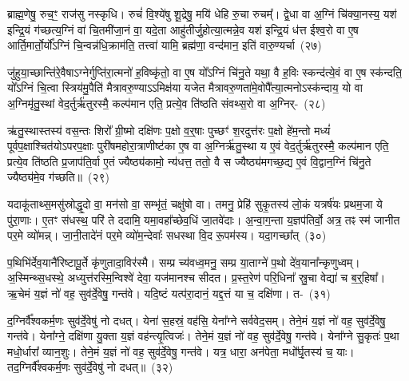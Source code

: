 ब्राह्म॒णेषु॒ रुच॒ꣳ॒ राज॑सु नस्कृधि। रुचं॑ वि॒श्ये॑षु शू॒द्रेषु॒ मयि॑ धेहि रु॒चा रुचम्᳚। द्वे॒धा वा अ॒ग्निं चि॑क्या॒नस्य॒ यश॑ इन्द्रि॒यं ग॑च्छत्य॒ग्निं वा॑ चि॒तमी॑जा॒नं वा॒ यदे॒ता आहु॑तीर्जु॒होत्या॒त्मन्ने॒व यश॑ इन्द्रि॒यं ध॑त्त ईश्व॒रो वा ए॒ष आर्ति॒मार्तो॒र्यो᳚\-ऽग्निं चि॒न्वन्न॑धि॒क्राम॑ति॒ तत्त्वा॑ यामि॒ ब्रह्म॑णा॒ वन्द॑मान॒ इति॑ वारु॒ण्यर्चा~(२७)\ip

जु॑हुया॒च्छान्ति॑रे॒वैषा\-ऽग्नेर्गुप्ति॑रा॒त्मनो॑ ह॒विष्कृ॑तो॒ वा ए॒ष यो᳚\-ऽग्निं चि॑नु॒ते यथा॒ वै ह॒विः स्कन्द॑त्ये॒वं वा ए॒ष स्क॑न्दति॒ यो᳚\-ऽग्निं चि॒त्वा स्त्रिय॑मु॒पैति॑ मैत्रावरु॒ण्या\-ऽऽमिक्ष॑या यजेत मैत्रावरु॒णता॑मे॒वोपै᳚त्या॒त्मनो\-ऽस्क॑न्दाय॒ यो वा अ॒ग्निमृ॑तु॒स्थां वेद॒र्तुर्\mbox{}ऋ॑तुरस्मै॒ कल्प॑मान एति॒ प्रत्ये॒व ति॑ष्ठति संवथ्स॒रो वा अ॒ग्निर्-~(२८)\ip

ऋ॑तु॒स्थास्तस्य॑ वस॒न्तः शिरो᳚ ग्री॒ष्मो दक्षि॑णः प॒क्षो व॒र्॒\mbox{}षाः पुच्छꣳ॑ श॒रदुत्त॑रः प॒क्षो हे॑म॒न्तो मध्यं॑ पूर्वप॒क्षाश्चित॑यो\-ऽपरप॒क्षाः पुरी॑षमहोरा॒त्राणीष्ट॑का ए॒ष वा अ॒ग्निर्\mbox{}ऋ॑तु॒स्था य ए॒वं वेद॒र्तुर्\mbox{}ऋ॑तुरस्मै॒ कल्प॑मान एति॒ प्रत्ये॒व ति॑ष्ठति प्र॒जा\-प॑ति॒र्वा ए॒तं ज्यैष्ठ्य॑कामो॒ न्य॑धत्त॒ ततो॒ वै स ज्यैष्ठ्य॑मगच्छ॒द्य ए॒वं वि॒द्वान॒ग्निं चि॑नु॒ते ज्यैष्ठ्य॑मे॒व ग॑च्छति॥~(२९)\ip

{\anuvakamend[{पृ॒थि॒वीं य॑च्छ॒ यथ्स्व॑यमातृ॒ण्णा उ॑प॒धाय॑ धेह्यृ॒चाग्निश्चि॑नु॒ते त्रीणि॑ च}]}

यदाकू॑ताथ्स॒मसु॑स्रोद्धृ॒दो वा॒ मन॑सो वा॒ सम्भृ॑तं॒ चक्षु॑षो वा। तमनु॒ प्रेहि॑ सुकृ॒तस्य॑ लो॒कं यत्रर्\mbox{}ष॑यः प्रथम॒जा ये पु॑रा॒णाः। ए॒तꣳ स॑धस्थ॒ परि॑ ते ददामि॒ यमा॒वहा᳚च्छेव॒धिं जा॒तवे॑दाः। अ॒न्वा॒ग॒न्ता य॒ज्ञप॑तिर्वो॒ अत्र॒ तꣴ स्म॑ जानीत पर॒मे व्यो॑मन्न्। जा॒नी॒तादे॑नं पर॒मे व्यो॑म॒न्देवाः᳚ सधस्था वि॒द रू॒पम॑स्य। यदा॒गच्छा᳚त्~(३०)\ip

प॒थिभि॑र्देव॒यानै॑रिष्टापू॒र्ते कृ॑णुतादा॒विर॑स्मै। सम्प्र च्य॑वध्व॒मनु॒ सम्प्र या॒ताग्ने॑ प॒थो दे॑व॒याना᳚न्कृणुध्वम्। अ॒स्मिन्थ्स॒धस्थे॒ अध्युत्त॑रस्मि॒न्विश्वे॑ देवा॒ यज॑मानश्च सीदत। प्र॒स्त॒रेण॑ परि॒धिना᳚ स्रु॒चा वेद्या॑ च ब॒र्॒\mbox{}हिषा᳚। ऋ॒चेमं य॒ज्ञं नो॑ वह॒ सुव॑र्दे॒वेषु॒ गन्त॑वे। यदि॒ष्टं यत्प॑रा॒दानं॒ यद्द॒त्तं या च॒ दक्षि॑णा। त-~(३१)\ip

द॒ग्निर्वै᳚श्वकर्म॒णः सुव॑र्दे॒वेषु॑ नो दधत्। येना॑ स॒हस्रं॒ वह॑सि॒ येना᳚ग्ने सर्ववेद॒सम्। तेने॒मं य॒ज्ञं नो॑ वह॒ सुव॑र्दे॒वेषु॒ गन्त॑वे। येना᳚ग्ने॒ दक्षि॑णा यु॒क्ता य॒ज्ञं वह॑न्त्यृ॒त्विजः॑। तेने॒मं य॒ज्ञं नो॑ वह॒ सुव॑र्दे॒वेषु॒ गन्त॑वे। येना᳚ग्ने सु॒कृतः॑ प॒था मधो॒र्धारा᳚ व्यान॒शुः। तेने॒मं य॒ज्ञं नो॑ वह॒ सुव॑र्दे॒वेषु॒ गन्त॑वे। यत्र॒ धारा॒ अन॑पेता॒ मधो᳚र्घृ॒तस्य॑ च॒ याः। तद॒ग्निर्वै᳚श्वकर्म॒णः सुव॑र्दे॒वेषु॑ नो दधत्॥~(३२)\ip

